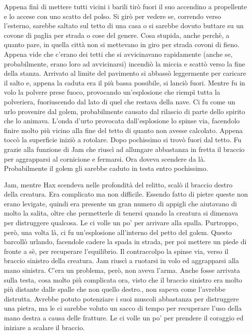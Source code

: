     Appena finì di mettere tutti vicini i barili tirò fuori il suo
    accendino a propellente e lo accese con uno scatto del polso. Si girò
    per vedere se, correndo verso l'esterno, sarebbe saltato sul tetto di
    una casa o si sarebbe dovuto buttare su un covone di paglia per strada
    o cose del genere. Cosa stupida, anche perchè, a quanto pare, in quella
    città non si mettevano in giro per strada covoni di fieno. Appena vide
    che c'erano dei tetti che si avvicinavano rapidamente (anche se,
    probabilmente, erano loro ad avvicinarsi) incendiò la miccia e scattò
    verso la fine della stanza. Arrivato al limite del pavimento si abbassò
    leggermente per caricare il salto e, appena la caduta era il più bassa
    possibile, si lanciò fuori. Mentre fu in volo la polvere prese fuoco,
    provocando un'esplosione che riempì tutta la polveriera, fuoriuscendo
    dal lato di quel che restava della nave. Ci fu come un urlo provenire
    dal golem, probabilmente causato dal rilascio di parte dello spirito
    che lo animava. L'onda d'urto provocata
    dall'esplosione lo spinse via, facendolo finire molto più vicino alla
    fine del tetto di quanto non avesse calcolato. Appena toccò la
    superficie iniziò a rotolare. Dopo pochissimo si trovò fuori dal tetto.
    Fu grazie alla funzione di Jam che riuscì ad allungare abbastanza in
    fretta il braccio per aggrapparsi al cornicione e fermarsi. Ora doveva
    scendere da là. Probabilmente il golem gli sarebbe caduto in testa
    entro pochissimo.

    Jam, mentre Hax scendeva nelle profondità del relitto, scalò il braccio
    destro della creatura. Era complicato ma non difficile. Essendo fatto
    di pietre queste non erano levigate, quindi era presente un gran numero
    di appigli che aiutavano di molto la salita, oltre che permetterle di
    tenersi quando la creatura si dimenava per distruggere qualcosa. Le ci
    volle un po' per arrivare alla spalla. Purtroppo, però, una volta là,
    ci fu un'esplosione all'interno del petto del golem. Questo barcollò
    urlando,
    facendole cadere la spada in strada, per poi mettere un piede di fronte
    a sè, per recuperare l'equilibrio. Il contraccolpo la spinse via, verso
    il braccio sinistro della creatura. Jam riuscì a ruotarsi in volo ed
    aggrapparsi alla mano sinistra. C'era un problema, però, non aveva
    l'arma. Anche fosse arrivata sulla testa, cosa molto più complicata
    ora, visto che il braccio sinistro era molto più distante dalle spalle
    che non quello destro., non sapeva come l'avrebbe distrutta. Avrebbe
    potuto potenziare i suoi muscoli abbastanza per distruggere una pietra,
    ma le ci sarebbe voluto un sacco di tempo per recuperare l'uso della
    mano destra a causa delle fratture. Le ci volle un po' per prendere il
    coraggio ed iniziare a scalare il braccio.


